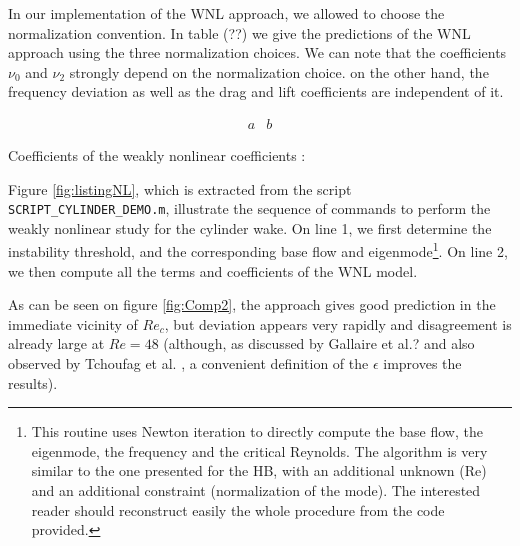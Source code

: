 \documentclass[twocolumn,10pt]{asme2ej}
\begin{document}
In our implementation of the WNL approach, we allowed to choose the normalization convention. 
In table (??) we give the predictions of the WNL approach using the three normalization choices.
We can note that the coefficients $\nu_0$ and $\nu_2$ strongly depend on the normalization choice.
on the other hand, the frequency deviation as well as the drag and lift coefficients are independent of it.
 


\begin{table}
$$\begin{array}{cc}
a&b
\end{array}$$
\caption{Coefficients of the weakly nonlinear coefficients : }
\end{table}




Figure \ref{fig:listingNL}, which is extracted from the script 
\verb|SCRIPT_CYLINDER_DEMO.m|, illustrate the sequence of commands to 
perform the weakly nonlinear study for the cylinder wake.
On line 1, we first determine the instability threshold, and the corresponding base flow 
and eigenmode\footnote{This routine uses Newton iteration to directly compute the 
base flow, the eigenmode, the frequency and the critical Reynolds. The algorithm is 
very similar to the one presented for the HB, with an additional unknown (Re) and an 
additional constraint (normalization of the mode). The interested reader should 
reconstruct easily the whole procedure from the code provided.}.
On line 2, we then compute all the terms and coefficients of the WNL model. 



As can be seen on figure \ref{fig:Comp2},  the approach gives good prediction in the immediate vicinity of $Re_c$, but deviation appears very rapidly and disagreement is already large at $Re=48$ (although, as discussed by Gallaire et al.? and also observed by Tchoufag et al. \cite{Tchoufag2015}, a convenient definition of the $\epsilon$ improves the results).
\end{document}

